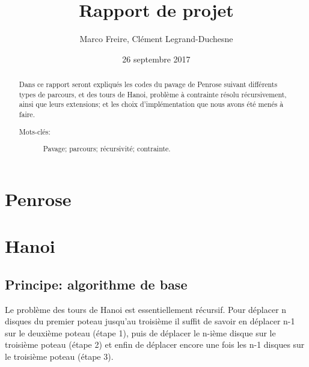 \documentclass[a4paper, 11pt]{article}%
\begin{document}
\title{Rapport de projet}

\author{Marco Freire, Clément Legrand-Duchesne}

\date{26 septembre 2017}

\maketitle

\begin{abstract}
  Dans ce rapport seront expliqués les codes du pavage de Penrose
  suivant différents types de parcours, et des tours de Hanoi, problème
  à contrainte résolu récursivement, ainsi que leurs extensions; et les
  choix d'implémentation que nous avons été menés à faire.
  \begin{description}
    
  \item[Mots-clés:] Pavage; parcours; récursivité; contrainte.

   

  \end{description}
\end{abstract}


\section{Penrose}

\section{Hanoi}

	\subsection{Principe: algorithme de base}
		Le problème des tours de Hanoi est essentiellement récursif. Pour
		déplacer n disques du premier poteau jusqu'au troisième
		il suffit de savoir en déplacer n-1 sur le deuxième poteau (étape 1), puis
		de déplacer le n-ième disque sur le troisième poteau (étape 2) et enfin de
		déplacer encore une fois les n-1 disques sur le troisième poteau (étape 3).
\end{document}
